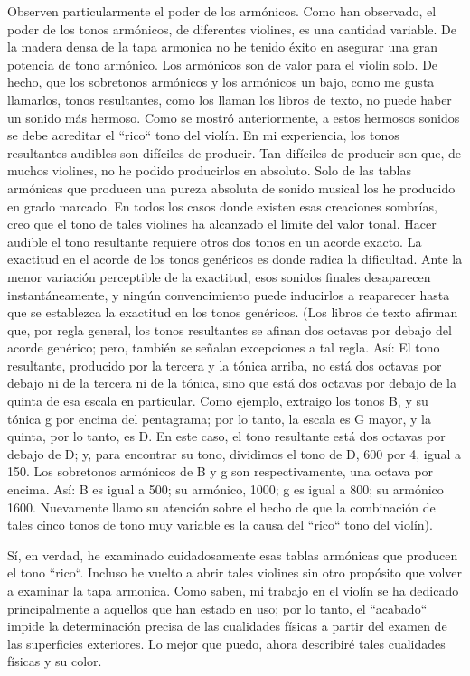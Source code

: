 \documentclass[12pt]{book}
\begin{document}
Observen particularmente el poder de los armónicos. Como han observado, el poder de los tonos armónicos, de diferentes violines, es una cantidad variable. De la madera densa de la tapa armonica no he tenido éxito en asegurar una gran potencia de tono armónico. Los armónicos son de valor para el violín solo. De hecho, que los sobretonos armónicos y los armónicos un bajo, como me gusta llamarlos, tonos resultantes, como los llaman los libros de texto, no puede haber un sonido más hermoso. Como se mostró anteriormente, a estos hermosos sonidos se debe acreditar el ``rico`` tono del violín. En mi experiencia, los tonos resultantes audibles son difíciles de producir. Tan difíciles de producir son que, de muchos violines, no he podido producirlos en absoluto. Solo de las tablas armónicas que producen una pureza absoluta de sonido musical los he producido en grado marcado. En todos los casos donde existen esas creaciones sombrías, creo que el tono de tales violines ha alcanzado el límite del valor tonal. Hacer audible el tono resultante requiere otros dos tonos en un acorde exacto. La exactitud en el acorde de los tonos genéricos es donde radica la dificultad. Ante la menor variación perceptible de la exactitud, esos sonidos finales desaparecen instantáneamente, y ningún convencimiento puede inducirlos a reaparecer hasta que se establezca la exactitud en los tonos genéricos. (Los libros de texto afirman que, por regla general, los tonos resultantes se afinan dos octavas por debajo del acorde genérico; pero, también se señalan excepciones a tal regla. Así: El tono resultante, producido por la tercera y la tónica arriba, no está dos octavas por debajo ni de la tercera ni de la tónica, sino que está dos octavas por debajo de la quinta de esa escala en particular. Como ejemplo, extraigo los tonos B, y su tónica g por encima del pentagrama; por lo tanto, la escala es G mayor, y la quinta, por lo tanto, es D. En este caso, el tono resultante está dos octavas por debajo de D; y, para encontrar su tono, dividimos el tono de D, 600 por 4, igual a 150. Los sobretonos armónicos de B y g son respectivamente, una octava por encima. Así: B es igual a 500; su armónico, 1000; g es igual a 800; su armónico 1600. Nuevamente llamo su atención sobre el hecho de que la combinación de tales cinco tonos de tono muy variable es la causa del ``rico`` tono del violín).

Sí, en verdad, he examinado cuidadosamente esas tablas armónicas que producen el tono ``rico``. Incluso he vuelto a abrir tales violines sin otro propósito que volver a examinar la tapa armonica. Como saben, mi trabajo en el violín se ha dedicado principalmente a aquellos que han estado en uso; por lo tanto, el ``acabado`` impide la determinación precisa de las cualidades físicas a partir del examen de las superficies exteriores. Lo mejor que puedo, ahora describiré tales cualidades físicas y su color.
\end{document}
